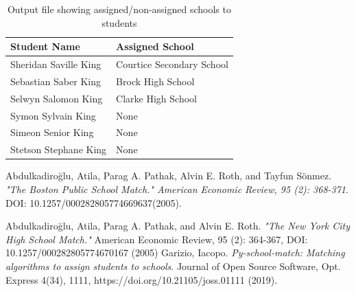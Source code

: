 \documentclass[twocolumn]{bmcart}
\begin{document}
	{\small
		\begin{table}[h!]
			\centering
			\small
			\caption{Output file showing assigned/non-assigned schools to students}
			\label{table:review}
			\begin{tabular}{| p{3cm}| p{3cm}| }
				\hline
				Student Name & Assigned School \\ \hline
				
				Sheridan Saville King & Courtice Secondary School\\\hline
				
				Sebastian Saber King & Brock High School\\\hline
				
				Selwyn Salomon King & Clarke High School\\\hline
				
				Symon Sylvain King & None\\\hline
				
				Simeon Senior King & None\\\hline
				
				Stetson Stephane King & None\\\hline
				
				
			\end{tabular}%
		\end{table}%
	}
	\begin{backmatter}
		\begin{thebibliography}{9}
			Abdulkadiroğlu, Atila, Parag A. Pathak, Alvin E. Roth, and Tayfun Sönmez.
			\textit{"The Boston Public School Match." American Economic Review, 95 (2): 368-371}. 
			DOI: 10.1257/000282805774669637(2005).
			\vspace{\baselineskip}
			
			Abdulkadiroğlu, Atila, Parag A. Pathak, and Alvin E. Roth.
			\textit{"The New York City High School Match."}
			American Economic Review, {95 (2): 364-367}, DOI: 10.1257/000282805774670167 (2005)
			\vspace{\baselineskip}
			Garizio, Iacopo. 
			\textit{Py-school-match: Matching algorithms to assign students to schools}. 
			Journal of Open Source Software, Opt. Express {4(34)},
			1111, https://doi.org/10.21105/joss.01111 (2019).
			
		\end{thebibliography}
		
		
		
	\end{backmatter}
	
\end{document}
